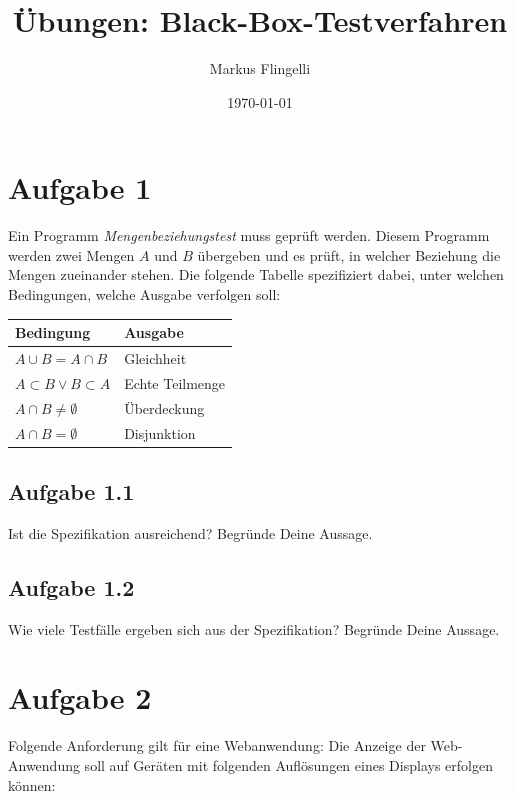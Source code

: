 

\title{Übungen: Black-Box-Testverfahren}
\author{Markus Flingelli}
\date{\today}


\maketitle

\section*{Aufgabe 1}
Ein Programm \emph{Mengenbeziehungstest} muss geprüft werden. Diesem Programm werden zwei Mengen $A$ und $B$ übergeben und es prüft, in welcher Beziehung die Mengen zueinander stehen. Die folgende Tabelle spezifiziert dabei, unter welchen Bedingungen, welche Ausgabe verfolgen soll:

\vspace{.3cm}

\begin{center}
\begin{tabular}{|l|l|}
\hline
\rowcolor{ivory}
\textbf{Bedingung} & \textbf{Ausgabe}\\ \hline
$A \cup B = A \cap B$ & Gleichheit\\ \hline
$A \subset B \lor B \subset A$ & Echte Teilmenge\\ \hline
$A \cap B \neq \emptyset$ & Überdeckung\\ \hline
$A \cap B = \emptyset$ & Disjunktion\\ \hline
\end{tabular}
\end{center}

\subsection*{Aufgabe 1.1}
Ist die Spezifikation ausreichend? Begründe Deine Aussage.

\subsection*{Aufgabe 1.2}
Wie viele Testfälle ergeben sich aus der Spezifikation? Begründe Deine Aussage.

\newpage
\section*{Aufgabe 2}

Folgende Anforderung gilt für eine Webanwendung: Die Anzeige der Web-Anwendung soll auf Geräten mit folgenden Auflösungen eines Displays erfolgen können:

